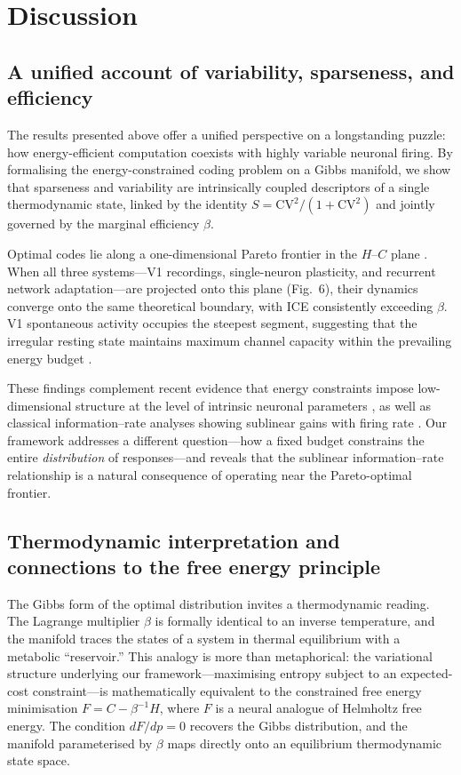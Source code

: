 \section{Discussion}

\subsection{A unified account of variability, sparseness, and efficiency}

The results presented above offer a unified perspective on a longstanding puzzle: how energy-efficient computation coexists with highly variable neuronal firing.  By formalising the energy-constrained coding problem on a Gibbs manifold, we show that sparseness and variability are intrinsically coupled descriptors of a single thermodynamic state, linked by the identity $S = \mathrm{CV}^2/(1+\mathrm{CV}^2)$ and jointly governed by the marginal efficiency $\beta$.

Optimal codes lie along a one-dimensional Pareto frontier in the $H$--$C$ plane \cite{laughlin_energy_2001, Harris2012, Shoval2012}.  When all three systems---V1 recordings, single-neuron plasticity, and recurrent network adaptation---are projected onto this plane (Fig.~6), their dynamics converge onto the same theoretical boundary, with ICE consistently exceeding $\beta$.  V1 spontaneous activity occupies the steepest segment, suggesting that the irregular resting state maintains maximum channel capacity within the prevailing energy budget \cite{Raichle2001}.

These findings complement recent evidence that energy constraints impose low-dimensional structure at the level of intrinsic neuronal parameters \cite{Sommer2026}, as well as classical information--rate analyses showing sublinear gains with firing rate \cite{Rieke1997,Sterling2015}.  Our framework addresses a different question---how a fixed budget constrains the entire \emph{distribution} of responses---and reveals that the sublinear information--rate relationship is a natural consequence of operating near the Pareto-optimal frontier.

\subsection{Thermodynamic interpretation and connections to the free energy principle}

The Gibbs form of the optimal distribution invites a thermodynamic reading.  The Lagrange multiplier $\beta$ is formally identical to an inverse temperature, and the manifold traces the states of a system in thermal equilibrium with a metabolic ``reservoir.''  This analogy is more than metaphorical: the variational structure underlying our framework---maximising entropy subject to an expected-cost constraint---is mathematically equivalent to the constrained free energy minimisation $F = C - \beta^{-1}H$, where $F$ is a neural analogue of Helmholtz free energy.  The condition $dF/dp = 0$ recovers the Gibbs distribution, and the manifold parameterised by $\beta$ maps directly onto an equilibrium thermodynamic state space.

